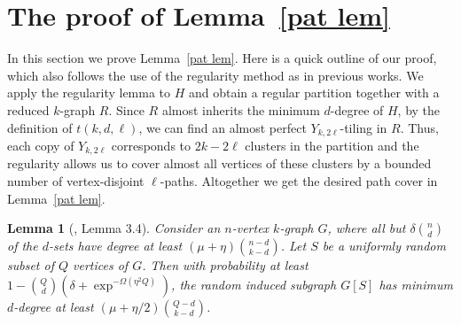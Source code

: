 \documentclass[11pt, reqno]{amsart}    	%
\newtheorem{lemma}[thm]{Lemma}
\theoremstyle{definition}
\numberwithin{equation}{section}
\begin{document}
	
	
	
	
	
	\section{The proof of Lemma~\ref{pat lem}}
	
	In this section we prove Lemma~\ref{pat lem}.
	Here is a quick outline of our proof, which also follows the use of the regularity method as in previous works.
	We apply the regularity lemma to $H$ and obtain a regular partition together with a reduced $k$-graph $R$.
	Since $R$ almost inherits the minimum $d$-degree of $H$, by the definition of $t(k,d,\ell)$, we can find an almost perfect $Y_{k,2\ell}$-tiling in $R$.
	Thus, each copy of $Y_{k,2\ell}$ corresponds to $2k-2\ell$ clusters in the partition and the regularity allows us to cover almost all vertices of these clusters by a bounded number of vertex-disjoint $\ell$-paths.
	Altogether we get the desired path cover in Lemma~\ref{pat lem}.
	
	\begin{lemma}[\cite{ferber2020diractype}, Lemma 3.4]
		\label{perfectdeg lem}
		Consider an $n$-vertex $k$-graph $G$, where all but $\delta \binom{n}{d}$ of the $d$-sets have degree at least $(\mu + \eta) \binom{n-d}{k-d}$. Let $S$ be a uniformly random subset of $Q$ vertices of $G$. Then with probability at least $1- \binom{Q}{d}(\delta+\exp^{-\Omega(\eta^{2}Q)})$, the random induced subgraph $G[S]$ has minimum $d$-degree at least $(\mu + \eta/2) \binom{Q-d}{k-d}$.
	\end{lemma}
	
\end{document}
